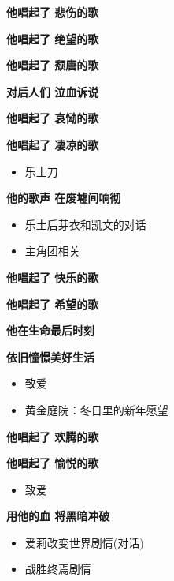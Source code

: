 \documentclass[a4paper]{article}
\begin{document}
\textbf{他唱起了 悲伤的歌}

\textbf{他唱起了 绝望的歌}

\textbf{他唱起了 颓唐的歌}

\textbf{对后人们 泣血诉说}

\textbf{他唱起了 哀恸的歌}

\textbf{他唱起了 凄凉的歌}

\begin{itemize}
    \item 乐土刀
\end{itemize}

\textbf{他的歌声 在废墟间响彻}

\begin{itemize}
    \item 乐土后芽衣和凯文的对话
    \item 主角团相关
\end{itemize}

\textbf{他唱起了 快乐的歌}

\textbf{他唱起了 希望的歌}

\textbf{他在生命最后时刻}

\textbf{依旧憧憬美好生活}

\begin{itemize}
    \item 致爱
    \item 黄金庭院：冬日里的新年愿望
\end{itemize}

\textbf{他唱起了 欢腾的歌}

\textbf{他唱起了 愉悦的歌}

\begin{itemize}
    \item 致爱
\end{itemize}

\textbf{用他的血 将黑暗冲破}

\begin{itemize}
    \item 爱莉改变世界剧情(对话)
    \item 战胜终焉剧情
\end{itemize}
\end{document}
